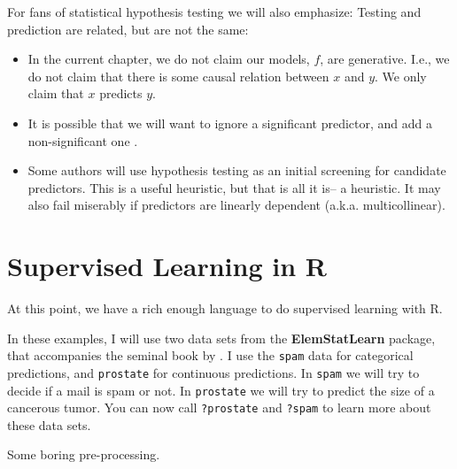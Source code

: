 \documentclass[]{book}
\providecommand{\tightlist}{%
  \setlength{\itemsep}{0pt}\setlength{\parskip}{0pt}}
\theoremstyle{definition}
\theoremstyle{definition}
\theoremstyle{definition}
\theoremstyle{remark}
\begin{document}
For fans of statistical hypothesis testing we will also emphasize:
Testing and prediction are related, but are not the same:

\begin{itemize}
\tightlist
\item
  In the current chapter, we do not claim our models, \(f\), are generative. I.e., we do not claim that there is some causal relation between \(x\) and \(y\). We only claim that \(x\) predicts \(y\).
\item
  It is possible that we will want to ignore a significant predictor, and add a non-significant one \citep{foster2004variable}.
\item
  Some authors will use hypothesis testing as an initial screening for candidate predictors.
  This is a useful heuristic, but that is all it is-- a heuristic. It may also fail miserably if predictors are linearly dependent (a.k.a. multicollinear).
\end{itemize}

\hypertarget{supervised-learning-in-r}{%
\section{Supervised Learning in R}\label{supervised-learning-in-r}}

At this point, we have a rich enough language to do supervised learning with R.

In these examples, I will use two data sets from the \textbf{ElemStatLearn} package, that accompanies the seminal book by \citet{friedman2001elements}.
I use the \texttt{spam} data for categorical predictions, and \texttt{prostate} for continuous predictions.
In \texttt{spam} we will try to decide if a mail is spam or not.
In \texttt{prostate} we will try to predict the size of a cancerous tumor.
You can now call \texttt{?prostate} and \texttt{?spam} to learn more about these data sets.

Some boring pre-processing.
\end{document}
